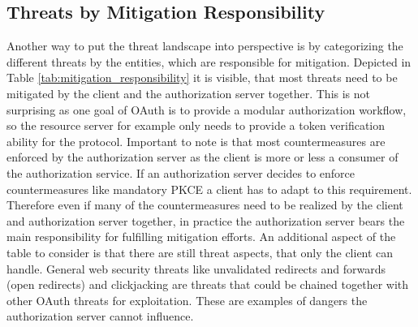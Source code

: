 \subsection{Threats by Mitigation Responsibility}
Another way to put the threat landscape into perspective is by categorizing the different threats by the entities, which are responsible for mitigation. Depicted in Table \ref{tab:mitigation_responsibility} it is visible, that most threats need to be mitigated by the client and the authorization server together. This is not surprising as one goal of OAuth is to provide a modular authorization workflow, so the resource server for example only needs to provide a token verification ability for the protocol. Important to note is that most countermeasures are enforced by the authorization server as the client is more or less a consumer of the authorization service. If an authorization server decides to enforce countermeasures like mandatory PKCE a client has to adapt to this requirement. Therefore even if many of the countermeasures need to be realized by the client and authorization server together, in practice the authorization server bears the main responsibility for fulfilling mitigation efforts. An additional aspect of the table to consider is that there are still threat aspects, that only the client can handle. General web security threats like unvalidated redirects and forwards (open redirects) and clickjacking are threats that could be chained together with other OAuth threats for exploitation. These are examples of dangers the authorization server cannot influence.

